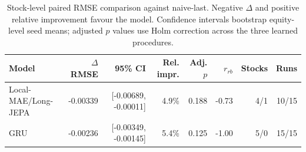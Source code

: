 \begin{table}[t]
\centering
\small
\caption{Stock-level paired RMSE comparison against naive-last. Negative $\Delta$ and positive relative improvement favour the model. Confidence intervals bootstrap equity-level seed means; adjusted $p$ values use Holm correction across the three learned procedures.}
\label{tab:paired_rmse_naive}
\begin{tabular}{lrrrrrrr}
\toprule
Model & $\Delta$RMSE & 95\% CI & Rel. impr. & Adj. $p$ & $r_{rb}$ & Stocks & Runs \\
\midrule
Local-MAE/Long-JEPA & -0.00339 & [-0.00689, -0.00011] & 4.9\% & 0.188 & -0.73 & 4/1 & 10/15 \\
GRU & -0.00236 & [-0.00349, -0.00145] & 5.4\% & 0.125 & -1.00 & 5/0 & 15/15 \\
\bottomrule
\end{tabular}
\end{table}
